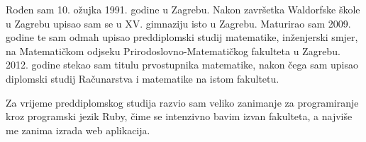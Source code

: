 \documentclass[a4paper,twoside,12pt]{scrreprt}
\begin{document}
\begin{cv}
  Rođen sam 10. ožujka 1991. godine u Zagrebu. Nakon završetka Waldorfske škole u Zagrebu upisao sam se u XV. gimnaziju isto u Zagrebu. Maturirao sam 2009. godine te sam odmah upisao preddiplomski studij matematike, inženjerski smjer, na Matematičkom odjseku Prirodoslovno-Matematičkog fakulteta u Zagrebu. 2012. godine stekao sam titulu prvostupnika matematike, nakon čega sam upisao diplomski studij Računarstva i matematike na istom fakultetu.

  Za vrijeme preddiplomskog studija razvio sam veliko zanimanje za programiranje kroz programski jezik Ruby, čime se intenzivno bavim izvan fakulteta, a najviše me zanima izrada web aplikacija.
\end{cv}
\end{document}
